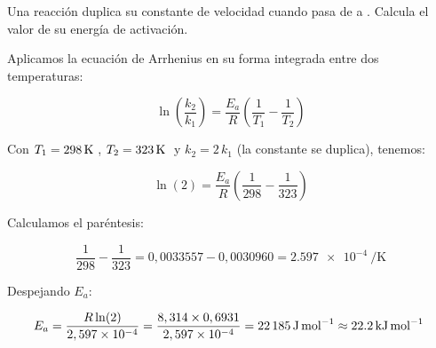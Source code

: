 \begin{exercise}
    Una reacción duplica su constante de velocidad cuando pasa de  a .
    Calcula el valor de su energía de activación.

    \begin{solu}

        Aplicamos la ecuación de Arrhenius en su forma integrada entre dos temperaturas:

        \begin{equation*}
            \ln \left( \dfrac{k_2}{k_1} \right) = \dfrac{E_a}{R} \left( \dfrac{1}{T_1} - \dfrac{1}{T_2} \right)
        \end{equation*}

        Con \(T_1 = \temperatura[k]{298}\), \(T_2 = \temperatura[k]{323}\) y \(k_2 = 2\, k_1\) (la constante se duplica), tenemos:

        \begin{equation*}
            \ln(2) = \dfrac{E_a}{R} \left( \dfrac{1}{298} - \dfrac{1}{323} \right)
        \end{equation*}

        Calculamos el paréntesis:

        \begin{equation*}
            \dfrac{1}{298} - \dfrac{1}{323} = 0,0033557 - 0,0030960 = \SI{2.597e-4}{\per\kelvin}
        \end{equation*}

        Despejando \(E_a\):

        \begin{equation*}
            E_a = \dfrac{R \ln(2)}{2,597 \times 10^{-4}} = \dfrac{8,314 \times 0,6931}{2,597 \times 10^{-4}} = \SI{22185}{\joule\per\mole} \approx \energia[kjmol]{22.2}
        \end{equation*}

    \end{solu}
\end{exercise}

